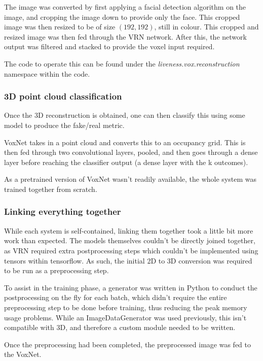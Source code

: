 \documentclass[10pt,a4paper]{article}
\begin{document}
            The image was converted by first applying a facial detection algorithm on the image, and cropping the image down to provide only the face. This cropped image was then resized to
            be of size $(192, 192)$, still in colour. This cropped and resized image was then fed through the VRN network. After this, the network output was filtered and stacked to provide the voxel input required.

            The code to operate this can be found under the \emph{liveness.vox.reconstruction} namespace within the code.

        \subsubsection{3D point cloud classification}
            Once the 3D reconstruction is obtained, one can then classify this using some model to produce the fake/real metric.
            
            VoxNet takes in a point cloud and converts this to an occupancy grid. This is then fed through two convolutional layers,
            pooled, and then goes through a dense layer before reaching the classifier output (a dense layer with the k outcomes). 

            As a pretrained version of VoxNet wasn't readily available, the whole system was trained together from scratch.

        \subsubsection{Linking everything together}
            While each system is self-contained, linking them together took a little bit more work than expected. The models themselves couldn't be directly joined together,
            as VRN required extra postprocessing steps which couldn't be implemented using tensors within tensorflow. As such, the initial 2D to 3D conversion was required to be run
            as a preprocessing step.

            To assist in the training phase, a generator was written in Python to conduct the postprocessing on the fly for each batch, which didn't require the entire preprocessing step to be done before training, 
            thus reducing the peak memory usage problems. While an ImageDataGenerator was used previously, this isn't compatible with 3D, and therefore a custom module needed to be written.

            Once the preprocessing had been completed, the preprocessed image was fed to the VoxNet. 
\end{document}
